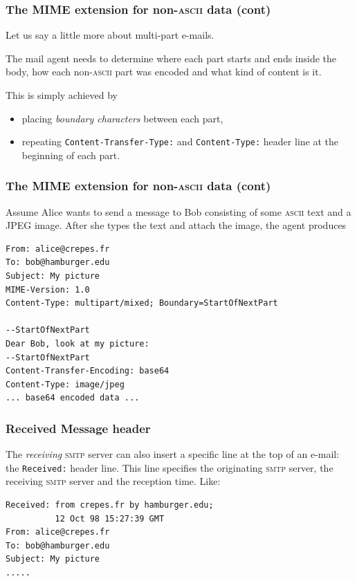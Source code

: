 %
\begin{frame}[containsverbatim]
\frametitle{The MIME extension for non-\textsc{ascii} data (cont)}

Let us say a little more about multi-part e-mails.

The mail agent needs to determine where each part starts and ends
inside the body, how each non-\textsc{ascii} part was encoded and what
kind of content is it.

This is simply achieved by
\begin{itemize}
  \item placing \emph{boundary characters} between each part,

  \item repeating \verb+Content-Transfer-Type:+ and
   \verb+Content-Type:+ header line at the beginning of each part.

\end{itemize}

\end{frame}

%
\begin{frame}[containsverbatim]
\frametitle{The MIME extension for non-\textsc{ascii} data (cont)}

Assume Alice wants to send a message to Bob consisting of some
\textsc{ascii} text and a JPEG image. After she types the text and
attach the image, the agent produces
{\small
\begin{verbatim}
From: alice@crepes.fr
To: bob@hamburger.edu
Subject: My picture
MIME-Version: 1.0
Content-Type: multipart/mixed; Boundary=StartOfNextPart

--StartOfNextPart
Dear Bob, look at my picture:
--StartOfNextPart
Content-Transfer-Encoding: base64
Content-Type: image/jpeg
... base64 encoded data ...
\end{verbatim}
}

\end{frame}

%
\begin{frame}[containsverbatim]
\frametitle{Received Message header}

The \emph{receiving} \textsc{smtp} server can also insert a specific
line at the top of an e-mail: the \verb+Received:+ header line. This
line specifies the originating \textsc{smtp} server, the receiving
\textsc{smtp} server and the reception time. Like:
{\small
\begin{verbatim}
Received: from crepes.fr by hamburger.edu;
          12 Oct 98 15:27:39 GMT
From: alice@crepes.fr
To: bob@hamburger.edu
Subject: My picture
.....
\end{verbatim}
}

\end{frame}

